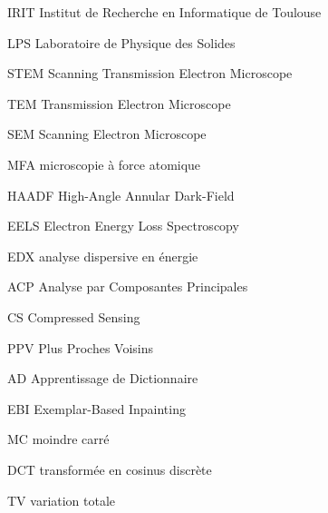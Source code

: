

           {IRIT}
           {Institut de Recherche en Informatique de Toulouse}

           {LPS}
           {Laboratoire de Physique des Solides}

           {STEM}
           {Scanning Transmission Electron Microscope}

           {TEM}
           {Transmission Electron Microscope}

           {SEM}
           {Scanning Electron Microscope}

           {MFA}
           {microscopie à force atomique}

           {HAADF}
           {High-Angle Annular Dark-Field}

           {EELS}
           {Electron Energy Loss Spectroscopy}

           {EDX}
           {analyse dispersive en énergie}


           {ACP}
           {Analyse par Composantes Principales}

           {CS}
           {Compressed Sensing}

           {PPV}
           {Plus Proches Voisins}

           {AD}
           {Apprentissage de Dictionnaire}

           {EBI}
           {Exemplar-Based Inpainting}

           {MC}
           {moindre carré}
        
           {DCT}
           {transformée en cosinus discrète}

           {TV}
           {variation totale}




